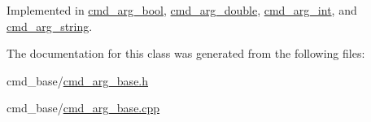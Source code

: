 Implemented in \hyperlink{classcmd__arg__bool_a588134657e85b4ce161f5030f354f00d}{cmd\-\_\-arg\-\_\-bool}, \hyperlink{classcmd__arg__double_a4b7dc6e7a0520080f456896635eaaa1a}{cmd\-\_\-arg\-\_\-double}, \hyperlink{classcmd__arg__int_a04883e51fb34d7c2e3b9c6b6e3151ad8}{cmd\-\_\-arg\-\_\-int}, and \hyperlink{classcmd__arg__string_a434d6b2a9a6ae7e35043113cc0551140}{cmd\-\_\-arg\-\_\-string}.



The documentation for this class was generated from the following files\-:\begin{DoxyCompactItemize}
\item 
cmd\-\_\-base/\hyperlink{cmd__arg__base_8h}{cmd\-\_\-arg\-\_\-base.\-h}\item 
cmd\-\_\-base/\hyperlink{cmd__arg__base_8cpp}{cmd\-\_\-arg\-\_\-base.\-cpp}\end{DoxyCompactItemize}

